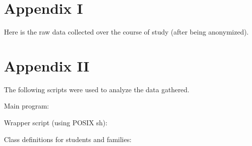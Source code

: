 \documentclass[12pt]{report}
\begin{document}
\chapter*{Appendix I}
Here is the raw data collected over the course of study (after being anonymized).

\chapter*{Appendix II}
The following scripts were used to analyze the data gathered.

Main program:



Wrapper script (using POSIX sh):



Class definitions for students and families:


\end{document}
